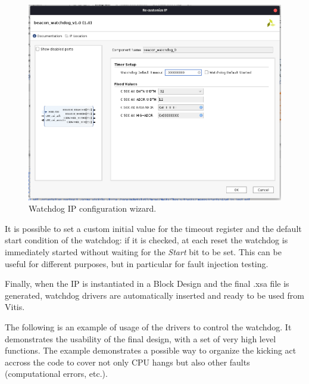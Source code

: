 \begin{figure}[H]
\centering
\includegraphics[width=0.8\linewidth]{images/chapter4/wizard_ip.png}
\caption{Watchdog IP configuration wizard.}
\label{fig:wd_ip_wizard}
\end{figure}

It is possible to set a custom initial value for the timeout register and the default start condition of the watchdog: if it is checked, at each reset the watchdog is immediately started without waiting for the \textit{Start} bit to be set. This can be useful for different purposes, but in particular for fault injection testing.\bigskip

Finally, when the IP is instantiated in a Block Design and the final .xsa file is generated, watchdog drivers are automatically inserted and ready to be used from Vitis.\bigskip

The following is an example of usage of the drivers to control the watchdog. It demonstrates the usability of the final design, with a set of very high level functions. The example demonstrates a possible way to organize the kicking act accross the code to cover not only CPU hangs but also other faults (computational errors, etc.).

